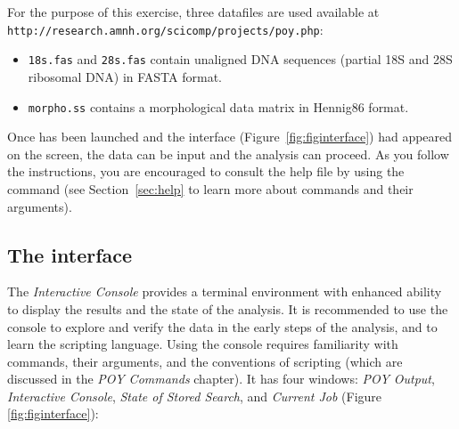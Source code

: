 For the purpose of this exercise, three datafiles are used available at \\
\texttt{http://research.amnh.org/scicomp/projects/poy.php}:

\begin{itemize}
	\item {\texttt{18s.fas} and \texttt{28s.fas} contain unaligned DNA sequences (partial 18S and 28S ribosomal DNA) in FASTA format.~\cite{pearson1988}}
	\item {\texttt{morpho.ss} contains a morphological data matrix in Hennig86 format.~\cite{farris1988}}
\end{itemize}

Once \poy has been launched and the interface (Figure~\ref{fig:figinterface}) had appeared on the screen, the data can be input and the analysis can proceed. As you follow the instructions, you are encouraged to consult the help file by using the command  (see Section~\ref{sec:help} to learn more about \poy commands and their arguments).

\subsection{The interface}

The \emph{Interactive Console} provides a terminal environment with enhanced ability to display the results and the state of the analysis. It is recommended to use the console to explore and verify the data in the early steps of the analysis, and to learn the scripting language. Using the console requires familiarity with \poy commands, their arguments, and the conventions of \poy scripting (which are discussed in the \emph{POY Commands} chapter). It has four windows: \emph{POY Output}, \emph{Interactive Console}, \emph{State of Stored Search}, and \emph{Current Job} (Figure \ref{fig:figinterface}):

